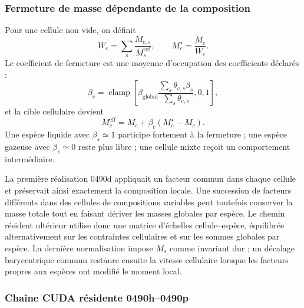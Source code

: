 \documentclass[11pt,a4paper]{article}
\begin{document}
\subsubsection{Fermeture de masse dépendante de la composition}

Pour une cellule non vide, on définit
\begin{equation}
  W_c=\sum_s\frac{M_{c,s}}{M_s^{\mathrm{ref}}},
  \qquad
  M_c^{\star}=\frac{M_c}{W_c}.
\end{equation}
Le coefficient de fermeture est une moyenne d'occupation des coefficients déclarés :
\begin{equation}
  \beta_c=\operatorname{clamp}\!\left[
  \beta_{\mathrm{global}}
  \frac{\sum_s\theta_{c,s}\beta_s}
       {\sum_s\theta_{c,s}},0,1\right],
\end{equation}
et la cible cellulaire devient
\begin{equation}
  M_c^{\mathrm{eff}}
  =M_c+\beta_c\left(M_c^{\star}-M_c\right).
\end{equation}
Une espèce liquide avec $\beta_s\simeq1$ participe fortement à la fermeture ; une espèce gazeuse avec $\beta_s\simeq0$ reste plus libre ; une cellule mixte reçoit un comportement intermédiaire.

La première réalisation 0490d appliquait un facteur commun dans chaque cellule et préservait ainsi exactement la composition locale. Une succession de facteurs différents dans des cellules de compositions variables peut toutefois conserver la masse totale tout en faisant dériver les masses globales par espèce. Le chemin résident ultérieur utilise donc une matrice d'échelles cellule--espèce, équilibrée alternativement sur les contraintes cellulaires et sur les sommes globales par espèce. La dernière normalisation impose $M_s$ comme invariant dur ; un décalage barycentrique commun restaure ensuite la vitesse cellulaire lorsque les facteurs propres aux espèces ont modifié le moment local.

\subsubsection{Chaîne CUDA résidente 0490h--0490p}
\end{document}
